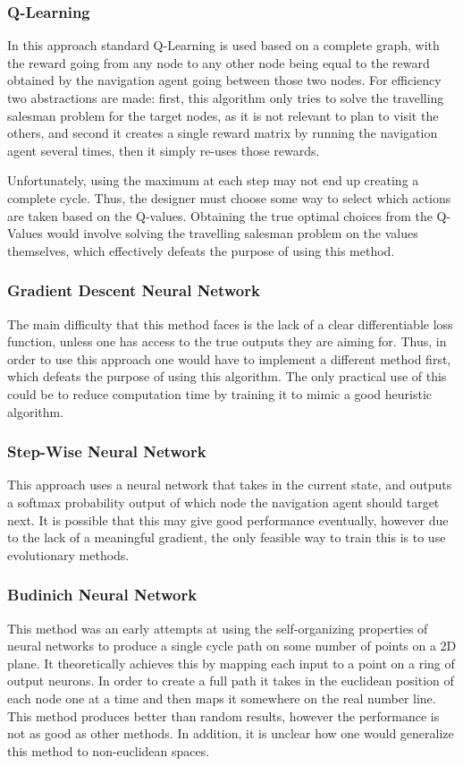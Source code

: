 \documentclass{article}
\begin{document}
    \subsubsection{Q-Learning}
    In this approach standard Q-Learning is used based on a complete graph, with the reward going from any node to any other node being equal to the reward obtained by the navigation agent going between those two nodes. For efficiency two abstractions are made: first, this algorithm only tries to solve the travelling salesman problem for the target nodes, as it is not relevant to plan to visit the others, and second it creates a single reward matrix by running the navigation agent several times, then it simply re-uses those rewards.
    
    Unfortunately, using the maximum at each step may not end up creating a complete cycle. Thus, the designer must choose some way to select which actions are taken based on the Q-values. Obtaining the true optimal choices from the Q-Values would involve solving the travelling salesman problem on the values themselves, which effectively defeats the purpose of using this method.
    
    \subsubsection{Gradient Descent Neural Network}
    The main difficulty that this method faces is the lack of a clear differentiable loss function, unless one has access to the true outputs they are aiming for. Thus, in order to use this approach one would have to implement a different method first, which defeats the purpose of using this algorithm. The only practical use of this could be to reduce computation time by training it to mimic a good heuristic algorithm.
    
    \subsubsection{Step-Wise Neural Network}
    This approach uses a neural network that takes in the current state, and outputs a softmax probability output of which node the navigation agent should target next. It is possible that this may give good performance eventually, however due to the lack of a meaningful gradient, the only feasible way to train this is to use evolutionary methods.
    
    \subsubsection{Budinich Neural Network}
    This method was an early attempts at using the self-organizing properties of neural networks to produce a single cycle path on some number of points on a 2D plane. It theoretically achieves this by mapping each input to a point on a ring of output neurons. In order to create a full path it takes in the euclidean position of each node one at a time and then maps it somewhere on the real number line. This method produces better than random results, however the performance is not as good as other methods. In addition, it is unclear how one would generalize this method to non-euclidean spaces.
    
\end{document}
